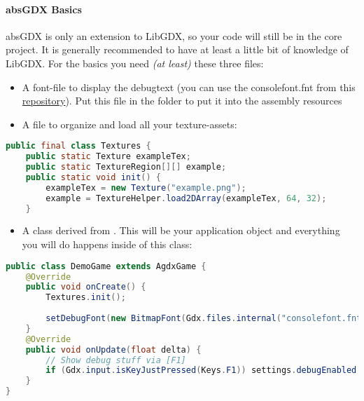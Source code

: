 \paragraph{absGDX Basics}

absGDX is only an extension to LibGDX, so your code will still be in the core project. It is generally recommended to have at least a little bit of knowledge of LibGDX.
For the basics you need \textit{(at least)} these three files:

\begin{itemize}
\item A font-file to display the debugtext (you can use the consolefont.fnt from this \hyperlink{https://github.com/Mikescher/absGDX/tree/master/android/assets}{repository}). Put this file in the  folder to put it into the assembly resources
\item A  file to organize and load all your texture-assets:
\end{itemize}

\doinline
\begin{lstlisting}[caption=Markdown Tutorial: fenced code block, title=\hspace{0 pt}, language=java]
public final class Textures {
	public static Texture exampleTex;
	public static TextureRegion[][] example;
	public static void init() {
		exampleTex = new Texture("example.png");
		example = TextureHelper.load2DArray(exampleTex, 64, 32);
	}
\end{lstlisting}

\begin{itemize}
\item A class derived from . This will be your application object and everything you will do happens inside of this class:
\end{itemize}

\doinline
\begin{lstlisting}[caption=Markdown Tutorial: fenced code block, title=\hspace{0 pt}, language=java]
public class DemoGame extends AgdxGame {	
	@Override
	public void onCreate() {
		Textures.init();
		
		setDebugFont(new BitmapFont(Gdx.files.internal("consolefont.fnt")));
	}
	@Override
	public void onUpdate(float delta) {
		// Show debug stuff via [F1]
		if (Gdx.input.isKeyJustPressed(Keys.F1)) settings.debugEnabled.doSwitch();
	}
}
\end{lstlisting}

